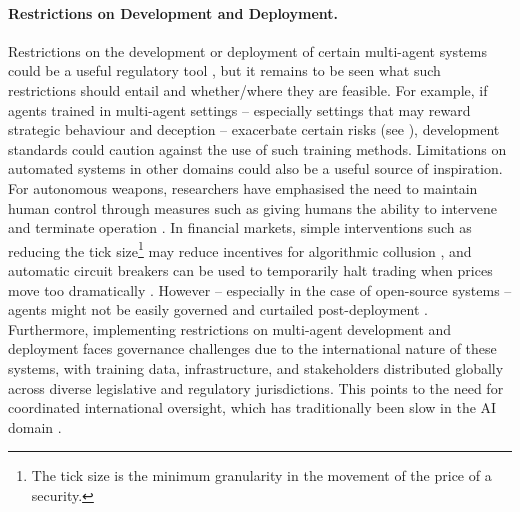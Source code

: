 \paragraph{Restrictions on Development and Deployment.}
Restrictions on the development or deployment of certain multi-agent systems could be a useful regulatory tool \citep{anderljung_frontier_2023,Mitchell2025}, but it remains to be seen what such restrictions should entail and whether/where they are feasible.  
For example, if agents trained in multi-agent settings -- especially settings that may reward strategic behaviour and deception -- exacerbate certain risks (see ), development standards could caution against the use of such training methods. %
Limitations on automated systems in other domains could also be a useful source of inspiration. 
For autonomous weapons, researchers have emphasised the need to maintain human control through measures such as giving humans the ability to intervene and terminate operation \citep[see also ]{amoroso_autonomous_2020,Renshaw2024,Congress2023}. 
In financial markets, simple interventions such as reducing the tick size\footnote{The tick size is the minimum granularity in the movement of the price of a security.} may reduce incentives for algorithmic collusion \citep{cartea_algorithmic_2022}, and automatic circuit breakers can be used to temporarily halt trading when prices move too dramatically \citep{Subrahmanyam2013}.
However -- especially in the case of open-source systems -- agents might not be easily governed and curtailed post-deployment \citep{seger2023open}. Furthermore, implementing restrictions on multi-agent development and deployment faces governance challenges due to the international nature of these systems, with training data, infrastructure, and stakeholders distributed globally across diverse legislative and regulatory jurisdictions. This points to the need for coordinated international oversight, which has traditionally been slow in the AI domain \citep{trager2023international}. 





